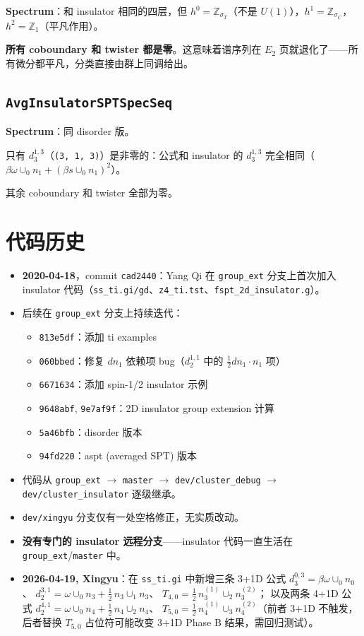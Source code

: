 \documentclass[a4paper,fontset=ubuntu,12pt]{ctexart}
\newcommand{\ZZ}{\mathbb{Z}}
\newcommand{\aT}{\sigma_T}
\newcommand{\aC}{\sigma_C}
\begin{document}
\textbf{Spectrum}：和 insulator 相同的四层，但 $h^0 = \ZZ_{\aT}$（不是 $U(1)$），$h^1 = \ZZ_{\aC}$，$h^2 = \ZZ_1$（平凡作用）。

\textbf{所有 coboundary 和 twister 都是零}。这意味着谱序列在 $E_2$ 页就退化了——所有微分都平凡，分类直接由群上同调给出。

\subsection{\texttt{AvgInsulatorSPTSpecSeq}}

\textbf{Spectrum}：同 disorder 版。

只有 $d_3^{1,3}$（\texttt{(3, 1, 3)}）是非零的：公式和 insulator 的 $d_3^{1,3}$ 完全相同（$\beta\omega \cup_0 n_1 + (\beta s \cup_0 n_1)^2$）。

其余 coboundary 和 twister 全部为零。

\section{代码历史}
\label{sec:history}

\begin{itemize}
\item \textbf{2020-04-18}，commit \texttt{cad2440}：Yang Qi 在 \texttt{group\_ext} 分支上首次加入 insulator 代码（\texttt{ss\_ti.gi/gd}、\texttt{z4\_ti.tst}、\texttt{fspt\_2d\_insulator.g}）。
\item 后续在 \texttt{group\_ext} 分支上持续迭代：
  \begin{itemize}
  \item \texttt{813e5df}：添加 ti examples
  \item \texttt{060bbed}：修复 $dn_1$ 依赖项 bug（$d_2^{1,1}$ 中的 $\frac{1}{2} dn_1 \cdot n_1$ 项）
  \item \texttt{6671634}：添加 spin-1/2 insulator 示例
  \item \texttt{9648abf}, \texttt{9e7af9f}：2D insulator group extension 计算
  \item \texttt{5a46bfb}：disorder 版本
  \item \texttt{94fd220}：aspt (averaged SPT) 版本
  \end{itemize}
\item 代码从 \texttt{group\_ext} $\to$ \texttt{master} $\to$ \texttt{dev/cluster\_debug} $\to$ \texttt{dev/cluster\_insulator} 逐级继承。
\item \texttt{dev/xingyu} 分支仅有一处空格修正，无实质改动。
\item \textbf{没有专门的 insulator 远程分支}——insulator 代码一直生活在 \texttt{group\_ext}/\texttt{master} 中。
\item \textbf{2026-04-19, Xingyu}：在 \texttt{ss\_ti.gi} 中新增三条 3+1D 公式
  $d_3^{0,3} = \beta\omega \cup_0 n_0$、
  $d_2^{3,1} = \omega \cup_0 n_3 + \frac{1}{2}\, n_3 \cup_1 n_3$、
  $T_{4,0} = \frac{1}{2}\, n_3^{(1)} \cup_2 n_3^{(2)}$；
  以及两条 4+1D 公式
  $d_2^{4,1} = \omega \cup_0 n_4 + \frac{1}{2}\, n_4 \cup_2 n_4$、
  $T_{5,0} = \frac{1}{2}\, n_4^{(1)} \cup_3 n_4^{(2)}$（前者 3+1D 不触发，后者替换 $T_{5,0}$ 占位符可能改变 3+1D Phase B 结果，需回归测试）。
\end{itemize}
\end{document}
